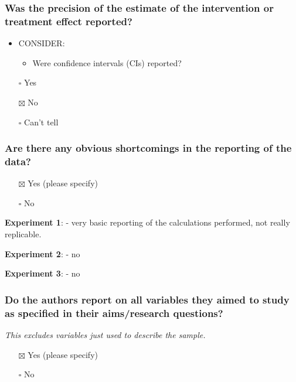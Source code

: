 \documentclass[
  doc, a4paper]{apa7}
\providecommand{\tightlist}{%
  \setlength{\itemsep}{0pt}\setlength{\parskip}{0pt}}
\begin{document}
\subsubsection{Was the precision of the estimate of the intervention or treatment effect reported?}\label{was-the-precision-of-the-estimate-of-the-intervention-or-treatment-effect-reported}

\begin{itemize}
\tightlist
\item
  CONSIDER:

  \begin{itemize}
  \tightlist
  \item
    Were confidence intervals (CIs) reported?
  \end{itemize}
\item[$\square$]
  Yes
\item[$\boxtimes$]
  No
\item[$\square$]
  Can't tell
\end{itemize}

\subsubsection{Are there any obvious shortcomings in the reporting of the data?}\label{are-there-any-obvious-shortcomings-in-the-reporting-of-the-data}

\begin{itemize}
\tightlist
\item[$\boxtimes$]
  Yes (please specify)
\item[$\square$]
  No
\end{itemize}

\textbf{Experiment 1}:
- very basic reporting of the calculations performed, not really replicable.

\textbf{Experiment 2}:
- no

\textbf{Experiment 3}:
- no

\subsubsection{Do the authors report on all variables they aimed to study as specified in their aims/research questions?}\label{do-the-authors-report-on-all-variables-they-aimed-to-study-as-specified-in-their-aimsresearch-questions}

\emph{This excludes variables just used to describe the sample.}

\begin{itemize}
\tightlist
\item[$\boxtimes$]
  Yes (please specify)
\item[$\square$]
  No
\end{itemize}
\end{document}
